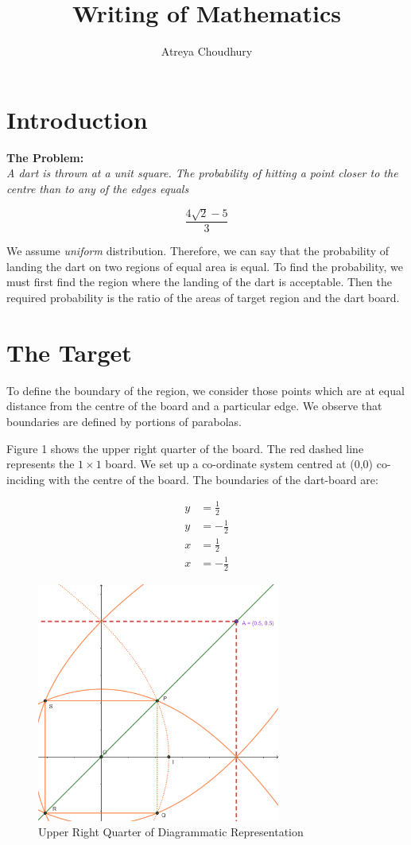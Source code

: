 \documentclass[10pt]{article}
\title{Writing of Mathematics}
\author{Atreya Choudhury}
\begin{document}
\maketitle

\section{Introduction}
\textbf{The Problem:}\\
\textit{A dart is thrown at a unit square. The probability of hitting a point closer to the centre than to any of the edges equals}

\begin{equation*}
  \frac{4\sqrt{2}-5}{3}
\end{equation*}

We assume \textit{uniform} distribution. Therefore, we can say that the probability of landing the dart on two regions of equal area is equal. To find the probability, we must first find the region where the landing of the dart is acceptable. Then the required probability is the ratio of the areas of target region and the dart board.

\section{The Target}
To define the boundary of the region, we consider those points which are at equal distance from the centre of the board and a particular edge. We observe that boundaries are defined by portions of parabolas.

Figure 1 shows the upper right quarter of the board. The red dashed line represents the $1\times1$ board. We set up a co-ordinate system centred at (0,0) co-inciding with the centre of the board. The boundaries of the dart-board are:

\begin{align*}
y &= \frac{1}{2}\\
y &= -\frac{1}{2}\\
x &= \frac{1}{2}\\
x &= -\frac{1}{2}
\end{align*}
\newpage
\begin{figure}[H]
\centering
\includegraphics[width = 8cm]{fig1.png}
\caption{Upper Right Quarter of Diagrammatic Representation}
\end{figure}
\end{document}
